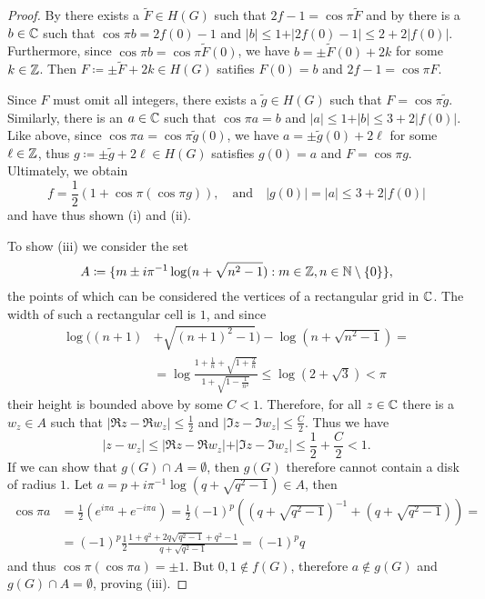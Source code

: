 \begin{proof}
    By  there exists a $\widetilde{F} \in H(G)$ such that $2f - 1 = \cos \pi \widetilde{F}$ and by  there is a $b \in \mathbb{C}$ such that $\cos \pi b = 2f(0) - 1$ and $\vert b \vert \leq 1 + \vert 2 f(0) - 1 \vert \leq 2 + 2 \vert f(0) \vert$. Furthermore, since $\cos \pi b = \cos \pi \widetilde{F}(0)$, we have $b = \pm \widetilde{F}(0) + 2k$ for some $k \in \mathbb{Z}$. Then $F \coloneqq \pm \widetilde{F} + 2k \in H(G)$ satifies $F(0) = b$ and $2f - 1 = \cos \pi F$.
    
    Since $F$ must omit all integers, there exists a $\widetilde{g} \in H(G)$ such that $F = \cos \pi \widetilde{g}$. Similarly, there is an $a \in \mathbb{C}$ such that $\cos \pi a = b$ and $\vert a \vert \leq 1 + \vert b \vert \leq 3 + 2 \vert f(0) \vert$. Like above, since $\cos \pi a = \cos \pi \widetilde{g}(0)$, we have $a = \pm \widetilde{g}(0) + 2\ell$ for some $\ell \in \mathbb{Z}$, thus $g \coloneqq \pm \widetilde{g} + 2\ell \in H(G)$ satisfies $g(0) = a$ and $F = \cos \pi g$. Ultimately, we obtain
    $$ \textstyle f = \frac{1}{2} (1 + \cos \pi (\cos \pi g)), \quad \textrm{and} \quad \vert g(0) \vert = \vert a \vert \leq 3 + 2 \vert f(0) \vert $$
    and have thus shown (i) and (ii).

    To show (iii) we consider the set
    $$ A \coloneqq \{ m \pm i \pi^{-1} \log (n + \sqrt{n^2 - 1}) : m \in \mathbb{Z}, n \in \mathbb{N} \setminus \{ 0 \} \}, $$
    the points of which can be considered the vertices of a rectangular grid in $\mathbb{C}$. The width of such a rectangular cell is $1$, and since
    \begin{align*}
        \log ((n+1) &+ \sqrt{(n+1)^2 - 1}) - \log (n + \sqrt{n^2 - 1}) = \\
        &= \log \frac{1 + \frac{1}{n} + \sqrt{1 + \frac{2}{n}}}{1 + \sqrt{1 - \frac{1}{n^2}}} \leq \log (2 + \sqrt{3}) < \pi
    \end{align*}
    their height is bounded above by some $C < 1$. Therefore, for all $z \in \mathbb{C}$ there is a $w_z \in A$ such that $\vert \Re z - \Re w_z \vert \leq \frac{1}{2}$ and $\vert \Im z - \Im w_z \vert \leq \frac{C}{2}$. Thus we have
    $$ \vert z - w_z \vert \leq \vert \Re z - \Re w_z \vert + \vert \Im z - \Im w_z \vert \leq \frac{1}{2} + \frac{C}{2} < 1. $$
    If we can show that $g(G) \cap A = \emptyset$, then $g(G)$ therefore cannot contain a disk of radius $1$. Let $a = p + i \pi^{-1} \log(q + \sqrt{q^2 - 1}) \in A$, then
    \begin{align*}
        \cos \pi a &= {\textstyle\frac{1}{2}}( e^{i \pi a} + e^{-i \pi a}) = {\textstyle\frac{1}{2}} (-1)^p ((q + \sqrt{q^2 - 1})^{-1} + (q + \sqrt{q^2 - 1})) = \\
        &= (-1)^p \frac{1}{2} \frac{1 + q^2 + 2q \sqrt{q^2 - 1} + q^2 - 1}{q + \sqrt{q^2 - 1}} = (-1)^p q
    \end{align*}
    and thus $\cos \pi (\cos \pi a) = \pm 1$. But $0, 1 \notin f(G)$, therefore $a \notin g(G)$ and $g(G) \cap A = \emptyset$, proving (iii).


\end{proof}
